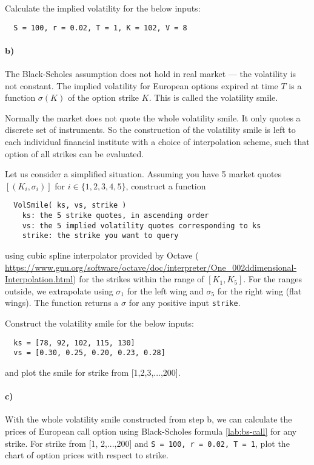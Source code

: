\documentclass[11pt,a4paper,hidelinks,fleqn]{article}            %
\begin{document}
Calculate the implied volatility for the below inputs: \vspace{-0.5cm}
\begin{verbatim}
  S = 100, r = 0.02, T = 1, K = 102, V = 8
\end{verbatim}

\paragraph{b)} The Black-Scholes assumption does not hold in real market 
--- the volatility is not constant.
The implied volatility for European options expired at time $T$ 
is a function $\sigma(K)$ of the option strike $K$.
This is called the volatility smile.

Normally the market does not quote the whole volatility smile.
It only quotes a discrete set of instruments.
So the construction of the volatility smile is left to each individual financial institute 
with a choice of interpolation scheme, such that option of all strikes can be evaluated.

Let us consider a simplified situation. 
Assuming you have 5 market quotes $[(K_i, \sigma_i)]$ for $i\in\{1, 2, 3, 4, 5\}$,
construct a function 
\vspace{-0.6cm}
\begin{verbatim}
  VolSmile( ks, vs, strike )
    ks: the 5 strike quotes, in ascending order
    vs: the 5 implied volatility quotes corresponding to ks
    strike: the strike you want to query
\end{verbatim}
\vspace{-0.6cm}
using cubic spline interpolator provided by Octave (
\url{https://www.gnu.org/software/octave/doc/interpreter/One_002ddimensional-Interpolation.html})
for the strikes within the range of $[K_1, K_5]$. For the ranges outside, we extrapolate using $\sigma_1$ for the left wing and $\sigma_5$ for the right wing (flat wings).
The function returns a $\sigma$ for any positive input \verb=strike=.

Construct the volatility smile for the below inputs:
\begin{verbatim}
  ks = [78, 92, 102, 115, 130]
  vs = [0.30, 0.25, 0.20, 0.23, 0.28]
\end{verbatim}
and plot the smile for strike from [1,2,3,...,200].

\paragraph{c)}
With the whole volatility smile constructed from step b, we can 
calculate the prices of European call option using Black-Scholes formula \eqref{lab:bs-call} for any strike.
For strike from [1, 2,...,200] and
\verb_S = 100, r = 0.02, T = 1_,
plot the chart of option prices with respect to strike.
\end{document}
